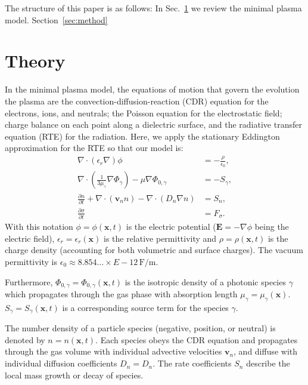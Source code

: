 \documentclass[3p]{elsarticle}
\begin{document}
The structure of this paper is as follows: In Sec.~\ref{sec:theory} we review the minimal plasma model. Section~\ref{sec:method}

\section{Theory}
\label{sec:theory}

In the minimal plasma model, the equations of motion that govern the evolution the plasma are the convection-diffusion-reaction (CDR) equation for the electrons, ions, and neutrals; the Poisson equation for the electrostatic field; charge balance on each point along a dielectric surface, and the radiative transfer equation (RTE) for the radiation. Here, we apply the stationary Eddington approximation for the RTE so that our model is: 
\begin{subequations}
  \begin{align}
    \label{eq:poisson}
    \nabla\cdot(\epsilon_r\nabla)\phi &= -\frac{\rho}{\epsilon_0}, \\
    \label{eq:eddington}
    \nabla\cdot\left(\frac{1}{3\mu_\gamma}\nabla\Phi_\gamma\right) - \mu\nabla\Phi_{0,\gamma} &= -S_\gamma, \\
    \label{eq:cdr}
    \frac{\partial n}{\partial t} + \nabla\cdot\left(\bm{v}_nn\right) - \nabla\cdot\left(D_n\nabla n\right) &= S_n, \\
    \label{eq:sigma}
    \frac{\partial \sigma}{\partial t} &= F_\sigma.
  \end{align}
\end{subequations}
With this notation $\phi = \phi(\bm{x},t)$ is the electric potential ($\bm{E} = -\nabla\phi$ being the electric field), $\epsilon_r = \epsilon_r(\bm{x})$ is the relative permittivity and $\rho = \rho(\bm{x},t)$ is the charge density (accounting for both volumetric and surface charges). The vacuum permittivity is $\epsilon_0 \approx 8.854\ldots\times E-12\,\text{F/m}$. 

Furthermore, $\Phi_{0,\gamma} = \Phi_{0,\gamma}(\bm{x},t)$ is the isotropic density of a photonic species $\gamma$ which propagates through the gas phase with absorption length $\mu_\gamma = \mu_\gamma(\bm{x})$. $S_\gamma = S_\gamma(\bm{x}, t)$ is a corresponding source term for the species $\gamma$. 

The number density of a particle species (negative, position, or neutral) is denoted by $n = n(\bm{x}, t)$. Each species obeys the CDR equation and propagates through the gas volume with individual advective velocities $\bm{v}_n$, and diffuse with individual diffusion coefficients $D_n = D_n$. The rate coefficients $S_n$ describe the local mass growth or decay of species. 
\end{document}
